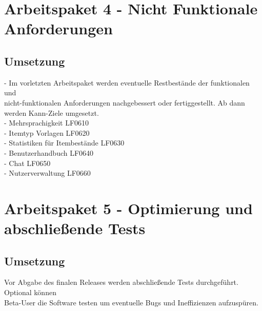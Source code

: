 \documentclass[11pt,a4paper]{report}
\begin{document}
\section{Arbeitspaket 4 - Nicht Funktionale Anforderungen }
\subsection{Umsetzung}
- Im vorletzten Arbeitspaket werden eventuelle Restbestände der funktionalen und\\ nicht-funktionalen Anforderungen nachgebessert oder fertiggestellt. Ab dann werden Kann-Ziele umgesetzt.\\
- Mehrsprachigkeit LF0610\\
- Itemtyp Vorlagen LF0620\\
- Statistiken für Itembestände LF0630\\
- Benutzerhandbuch LF0640\\
- Chat LF0650\\
- Nutzerverwaltung LF0660\\
\section{Arbeitspaket 5 - Optimierung und abschließende Tests}
\subsection{Umsetzung}
Vor Abgabe des finalen Releases werden abschließende Tests durchgeführt. Optional können\\ Beta-User die Software testen um eventuelle Bugs und Ineffizienzen aufzuspüren. \\
\end{document}
